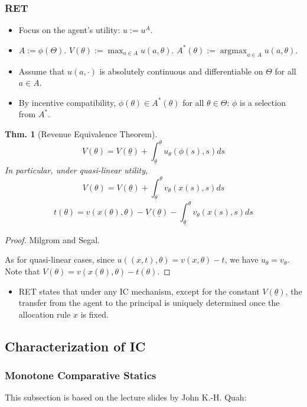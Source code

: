 \documentclass[11pt,a4paper,dvipdfmx]{article}
\theoremstyle{plain}
\newtheorem{thm}{Thm.}[section]
\newcommand{\1}{\mathbbm{1}}
\DeclareMathOperator*{\argmax}{argmax}
\begin{document}
\subsubsection{RET}
\begin{itemize}
	\item Focus on the agent's utility: $u := u^A$.
	\item $A := \phi(\Theta)$. $V(\theta) := \max_{a \in A} u(a, \theta)$. $A^*(\theta) := \argmax_{a \in A} u(a, \theta)$.
	\item Assume that $u(a, \cdot)$ is absolutely continuous and differentiable on $\Theta$ for all $a \in A$.
	\item By incentive compatibility, $\phi(\theta) \in A^*(\theta)$ for all $\theta \in \Theta$: $\phi$ is a selection from $A^*$.
\end{itemize}

\begin{thm}[Revenue Equivalence Theorem]
	\[
	V(\theta) = V(\underline{\theta}) + \int_{\underline{\theta}}^\theta
	 u_\theta(\phi(s), s) ds
	\]
	In particular, under quasi-linear utility, 
	\[
	V(\theta) = V(\underline{\theta}) + \int_{\underline{\theta}}^\theta
	 v_\theta(x(s), s) ds
	\]
	\[
	t(\theta) = v(x(\theta), \theta) - V(\underline{\theta}) - \int_{\underline{\theta}}^\theta
	 v_\theta(x(s), s) ds
	\]
\end{thm}
\begin{proof}
	Milgrom and Segal.
	
	As for quasi-linear cases, since
	$
	u((x,t), \theta) = v(x, \theta) - t
	$, we have $u_\theta = v_\theta$. Note that $V(\theta) = v(x(\theta), \theta) - t(\theta)$.
\end{proof}

\begin{itemize}
	\item RET states that under any IC mechanism, except for the constant $V(\underline{\theta})$, the transfer from the agent to the principal is uniquely determined once the allocation rule $x$ is fixed.
\end{itemize}


\subsection{Characterization of IC}
\subsubsection{Monotone Comparative Statics}
This subsection is based on the lecture slides by John K.-H. Quah:
\end{document}
